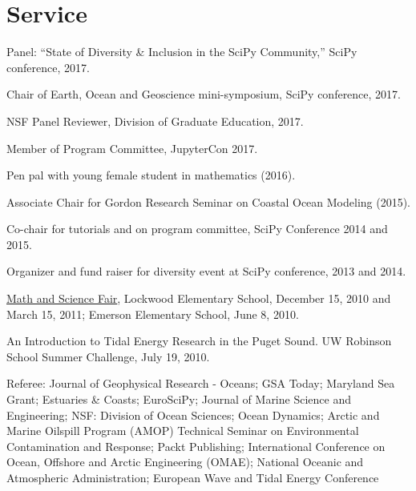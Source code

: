 \documentclass[10pt,letterpaper]{article}
\renewenvironment{itemize}{
  \begin{list}{}{
    \setlength{\leftmargin}{1.5em}
    \setlength{\itemsep}{0.25em}
    \setlength{\parskip}{0pt}
    \setlength{\parsep}{0.25em}
  }
}{
  \end{list}
}
\begin{document}
\section*{Service}
\begin{itemize}
  \item Panel: ``State of Diversity \& Inclusion in the SciPy Community,'' SciPy conference, 2017.
  \item Chair of Earth, Ocean and Geoscience mini-symposium, SciPy conference, 2017.
  \item NSF Panel Reviewer, Division of Graduate Education, 2017.
  \item Member of Program Committee, JupyterCon 2017.
  \item Pen pal with young female student in mathematics (2016).
  \item Associate Chair for Gordon Research Seminar on Coastal Ocean Modeling (2015).
  \item Co-chair for tutorials and on program committee, SciPy Conference 2014 and 2015.
  \item Organizer and fund raiser for diversity event at SciPy conference, 2013 and 2014.
	\item \href{http://www.amath.washington.edu/~siamuw/math-fair.html}{Math and Science Fair}, Lockwood Elementary School, December 15, 2010 and March 15, 2011; Emerson Elementary School, June 8, 2010.
	\item An Introduction to Tidal Energy Research in the Puget Sound. UW Robinson School Summer Challenge, July 19, 2010.
  \item Referee: Journal of Geophysical Research - Oceans; GSA Today; Maryland Sea Grant; Estuaries \& Coasts; EuroSciPy; Journal of Marine Science and Engineering; NSF: Division of Ocean Sciences; Ocean Dynamics; Arctic and Marine Oilspill Program (AMOP) Technical Seminar on Environmental Contamination and Response; Packt Publishing; International Conference on Ocean, Offshore and Arctic Engineering (OMAE); National Oceanic and Atmospheric Administration; European Wave and Tidal Energy Conference
\end{itemize}
\end{document}

